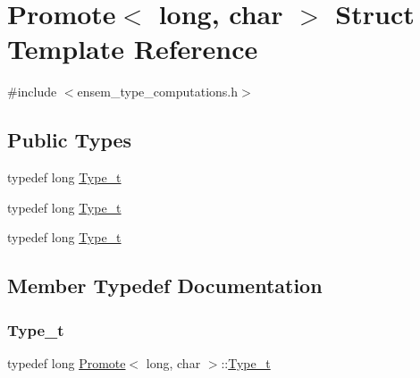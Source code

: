\hypertarget{structPromote_3_01long_00_01char_01_4}{}\section{Promote$<$ long, char $>$ Struct Template Reference}
\label{structPromote_3_01long_00_01char_01_4}


{\ttfamily \#include $<$ensem\+\_\+type\+\_\+computations.\+h$>$}

\subsection*{Public Types}
\begin{DoxyCompactItemize}
\item 
typedef long \mbox{\hyperlink{structPromote_3_01long_00_01char_01_4_a04c143edd9915a489849f8e7da76543d}{Type\+\_\+t}}
\item 
typedef long \mbox{\hyperlink{structPromote_3_01long_00_01char_01_4_a04c143edd9915a489849f8e7da76543d}{Type\+\_\+t}}
\item 
typedef long \mbox{\hyperlink{structPromote_3_01long_00_01char_01_4_a04c143edd9915a489849f8e7da76543d}{Type\+\_\+t}}
\end{DoxyCompactItemize}


\subsection{Member Typedef Documentation}
\mbox{\label{structPromote_3_01long_00_01char_01_4_a04c143edd9915a489849f8e7da76543d}} 
\subsubsection{\texorpdfstring{Type\_t}{Type\_t}\hspace{0.1cm}{\footnotesize\ttfamily [1/3]}}
{\footnotesize\ttfamily typedef long \mbox{\hyperlink{structPromote}{Promote}}$<$ long, char $>$\+::\mbox{\hyperlink{structPromote_3_01long_00_01char_01_4_a04c143edd9915a489849f8e7da76543d}{Type\+\_\+t}}}

\mbox{\label{structPromote_3_01long_00_01char_01_4_a04c143edd9915a489849f8e7da76543d}} 
